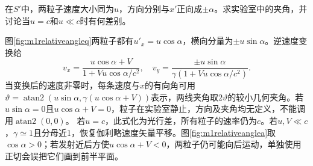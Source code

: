 \begin{example}\label{ex:m1relativeangle}
在$S'$中，两粒子速度大小同为$u$，方向分别与$x'$正向成$\pm\alpha$。求实验室中的夹角，并讨论当$u=c$和$u\ll c$时有何差别。
\end{example}
\begin{solution}
图\ref{fig:m1relativeangleq}两粒子都有$u'_x=u\cos\alpha$，横向分量为$\pm u\sin\alpha$。逆速度变换给
\[
 v_x=\frac{u\cos\alpha+V}{1+Vu\cos\alpha/c^2},\quad
 v_y=\frac{\pm u\sin\alpha}{\gamma(1+Vu\cos\alpha/c^2)}.
\]
当变换后的速度非零时，每条速度与$x$的有向角可用$\vartheta=\operatorname{atan2}(u\sin\alpha,\gamma(u\cos\alpha+V))$表示，两线夹角取$2\vartheta$的较小几何夹角。若$u\sin\alpha=0$且$u\cos\alpha+V=0$，粒子在实验室静止，方向及夹角均无定义，不能调用$\operatorname{atan2}(0,0)$。
若$u=c$，此式化为光行差，所有粒子的速率仍为$c$。若$u,V\ll c$，$\gamma\simeq1$且分母近1，恢复伽利略速度矢量平移。图\ref{fig:m1relativeanglea}取$\cos\alpha>0$；若发射近后方使$u\cos\alpha+V<0$，两粒子仍可能向后运动，单独使用正切会误把它们画到前半平面。
\end{solution}

